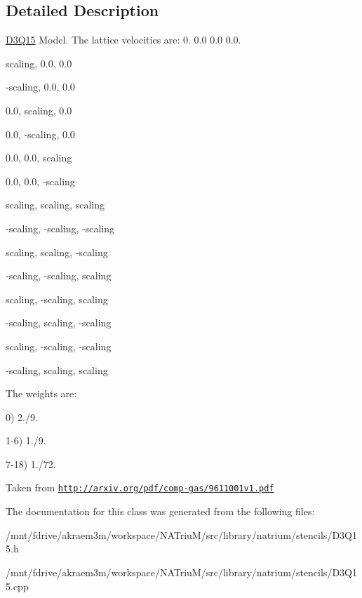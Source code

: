 \subsection{Detailed Description}
\hyperlink{classnatrium_1_1D3Q15}{D3Q15} Model. The lattice velocities are: 0. 0.0 0.0 0.0. 
\begin{DoxyEnumerate}
\item scaling, 0.0, 0.0
\item -\/scaling, 0.0, 0.0
\item 0.0, scaling, 0.0
\item 0.0, -\/scaling, 0.0
\item 0.0, 0.0, scaling
\item 0.0, 0.0, -\/scaling
\item scaling, scaling, scaling
\item -\/scaling, -\/scaling, -\/scaling
\item scaling, scaling, -\/scaling
\item -\/scaling, -\/scaling, scaling
\item scaling, -\/scaling, scaling
\item -\/scaling, scaling, -\/scaling
\item scaling, -\/scaling, -\/scaling
\item -\/scaling, scaling, scaling
\end{DoxyEnumerate}

The weights are:
\begin{DoxyItemize}
\item 0) 2./9.
\item 1-\/6) 1./9.
\item 7-\/18) 1./72.
\end{DoxyItemize}

Taken from \href{http://arxiv.org/pdf/comp-gas/9611001v1.pdf}{\tt http://arxiv.org/pdf/comp-\/gas/9611001v1.pdf} 

The documentation for this class was generated from the following files:\begin{DoxyCompactItemize}
\item 
/mnt/fdrive/akraem3m/workspace/NATriuM/src/library/natrium/stencils/D3Q15.h\item 
/mnt/fdrive/akraem3m/workspace/NATriuM/src/library/natrium/stencils/D3Q15.cpp\end{DoxyCompactItemize}

